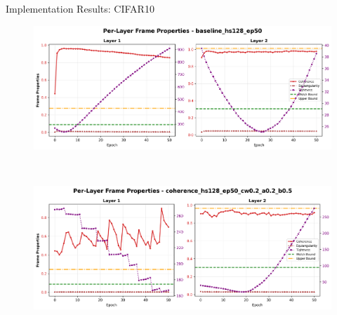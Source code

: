 \documentclass[9pt,dvipsnames]{beamer}
\begin{document}
\begin{frame}{Implementation Results: CIFAR10}
    \begin{figure}[H]
        \centering
        \begin{minipage}[b]{\textwidth}
            \centering
            \includegraphics[width=\textwidth,height=0.45\textheight,keepaspectratio]{../plots/mlp/cifar10/hs128_ep50/baseline_hs128_ep50_coherence_analysis.png}
        \end{minipage}\\[0.1em]
        \begin{minipage}[b]{\textwidth}
            \centering
            \includegraphics[width=\textwidth,height=0.45\textheight,keepaspectratio]{../plots/mlp/cifar10/hs128_ep50/coherence_hs128_ep50_cw0.2_a0.2_b0.5_coherence_analysis.png}
        \end{minipage}
    \end{figure}
\end{frame}
\end{document}
